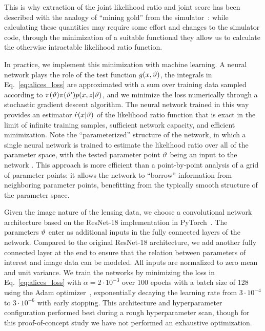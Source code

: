 \documentclass[twocolumn]{aastex62}
\begin{document}
This is why extraction of the joint likelihood ratio and joint score has been described with the analogy of ``mining gold'' from the simulator~\citep{1805.12244}: while calculating these quantities may require some effort and changes to the simulator code, through the minimization of a suitable functional they allow us to calculate the otherwise intractable likelihood ratio function.

In practice, we implement this minimization with machine learning. A neural network plays the role of the test function $g(x, \vartheta)$, the integrals in Eq.~\eqref{eq:alices_loss} are approximated with a sum over training data sampled according to $\pi(\vartheta) \pi(\vartheta') p(x,z|\vartheta)$, and we minimize the loss numerically through a stochastic gradient descent algorithm. The neural network trained in this way provides an estimator $\hat{r}(x|\vartheta)$ of the likelihood ratio function that is exact in the limit of infinite training samples, sufficient network capacity, and efficient minimization. Note the ``parameterized'' structure of the network, in which a single neural network is trained to estimate the likelihood ratio over all of the parameter space, with the tested parameter point $\vartheta$ being an input to the network \citep{Cranmer:2015bka, Baldi:2016fzo}. This approach is more efficient than a point-by-point analysis of a grid of parameter points: it allows the network to ``borrow'' information from neighboring parameter points, benefitting from the typically smooth structure of the parameter space.

Given the image nature of the lensing data, we choose a convolutional network architecture based on the ResNet-18 \citep{he2016deep} implementation in PyTorch~\citep{paszke2017automatic}. The parameters $\vartheta$ enter as additional inputs in the fully connected layers of the network. Compared to the original ResNet-18 architecture, we add another fully connected layer at the end to ensure that the relation between parameters of interest and image data can be modeled. All inputs are normalized to zero mean and unit variance. We train the networks by minimizing the loss in Eq.~\eqref{eq:alices_loss} with $\alpha = 2 \cdot 10^{-3}$ over 100 epochs with a batch size of 128 using the Adam optimizer~\citep{2014arXiv1412.6980K}, exponentially decaying the learning rate from $3\cdot 10^{-4}$ to $3 \cdot 10^{-6}$ with early stopping. This architecture and hyperparameter configuration performed best during a rough hyperparameter scan, though for this proof-of-concept study we have not performed an exhaustive optimization.
\end{document}
